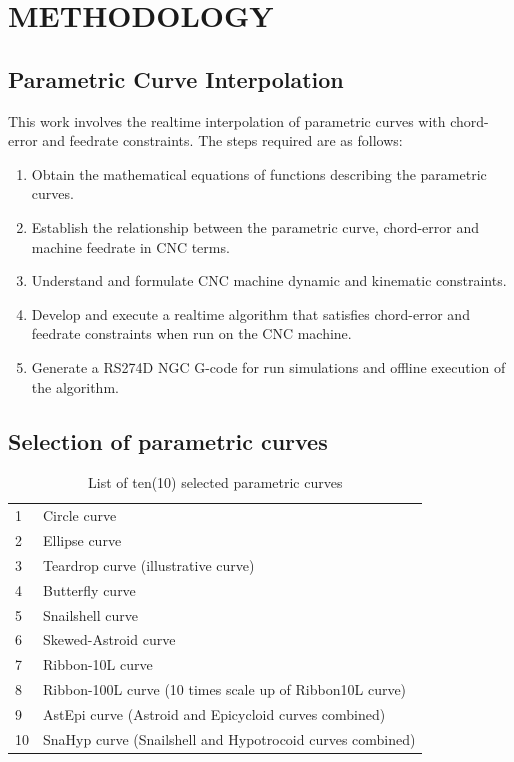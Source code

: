 \chapter{METHODOLOGY}
\label{ch:tocloft}

\section{Parametric Curve Interpolation}

This work involves the realtime interpolation of parametric curves with chord-error and feedrate constraints. The steps required are as follows:

\begin{enumerate}
	\item Obtain the mathematical equations of functions describing the parametric curves.
	
	\item Establish the relationship between the parametric curve, chord-error and machine feedrate in CNC terms. 
	
	\item Understand and formulate CNC machine dynamic and kinematic constraints.
	
	\item Develop and execute a realtime algorithm that satisfies chord-error and feedrate constraints when run on the CNC machine.
	
	\item Generate a RS274D NGC G-code for run simulations and offline execution of the algorithm.

\end{enumerate}
  

\section{Selection of parametric curves}

\begin{table}[ht]
\caption{List of ten(10) selected parametric curves}
\label{List-of-selected-parametric-curves}
\begin{tabular}{ p{1.00cm} p{11.0cm}}
\hline
	1  & Circle curve\\
	2  & Ellipse curve \\   
	3  & Teardrop curve  (illustrative curve)\\   
	4  & Butterfly curve \\
    5  & Snailshell curve \\
    6  & Skewed-Astroid curve \\
    7  & Ribbon-10L curve \\
    8  & Ribbon-100L curve (10 times scale up of Ribbon10L curve)\\	
	9  & AstEpi curve (Astroid and Epicycloid curves combined) \\   
    10  & SnaHyp curve (Snailshell and Hypotrocoid curves combined)\\   
\hline
\end{tabular}
\end{table}

